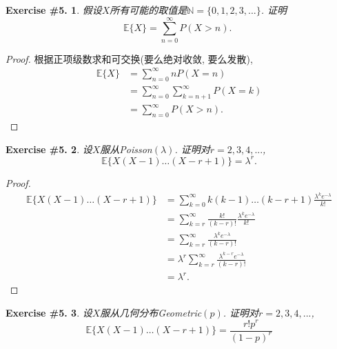 \documentclass[UTF8, a4paper]{article}
\newtheorem{exercise}{Exercise \#5.}
\begin{document}
\begin{framed}
\begin{exercise}
假设\(X\)所有可能的取值是\(\mathbb{N} = \{0,1,2,3,...\}\). 证明 
$$
\mathbb{E}\{X\}=\sum_{n=0}^{\infty} P(X>n) \text {. }
$$
\end{exercise}
\end{framed}

\begin{proof}
根据正项级数求和可交换(要么绝对收敛, 要么发散), 
$$
\begin{aligned}
    \mathbb{E}\{X\} &= \sum_{n=0}^{\infty} n P(X = n) \\
    &= \sum_{n=0}^{\infty} \sum_{k=n+1}^{\infty} P(X = k) \\
    &= \sum_{n=0}^{\infty} P(X > n).
\end{aligned}
$$
\end{proof}



\begin{framed}
\begin{exercise}
    设\(X\)服从Poisson\((\lambda)\). 证明对\(r = 2,3,4,...\),
    $$
\mathbb{E}\{X(X-1) \ldots(X-r+1)\}=\lambda^r.
$$
\end{exercise}
\end{framed}

\begin{proof}
$$
\begin{aligned}
    \mathbb{E}\{X(X-1) \ldots(X-r+1)\} &= \sum_{k=0}^{\infty} k(k-1) \ldots (k-r+1) \frac{\lambda^k e^{-\lambda}}{k!} \\
    &= \sum_{k=r}^{\infty} \frac{k!}{(k-r)!} \frac{\lambda^k e^{-\lambda}}{k!} \\
    &= \sum_{k=r}^{\infty} \frac{\lambda^k e^{-\lambda}}{(k-r)!} \\
    &= \lambda^r \sum_{k=r}^{\infty} \frac{\lambda^{k-r} e^{-\lambda}}{(k-r)!} \\
    &= \lambda^r.
\end{aligned}
$$
\end{proof}


\begin{framed}
\begin{exercise}
    设\(X\)服从几何分布Geometric\((p)\). 证明对\(r = 2,3,4,...\),
$$
\mathbb{E}\{X(X-1) \ldots(X-r+1)\}=\frac{r!p^r}{(1-p)^r}
$$
\end{exercise}
\end{framed}
\end{document}

